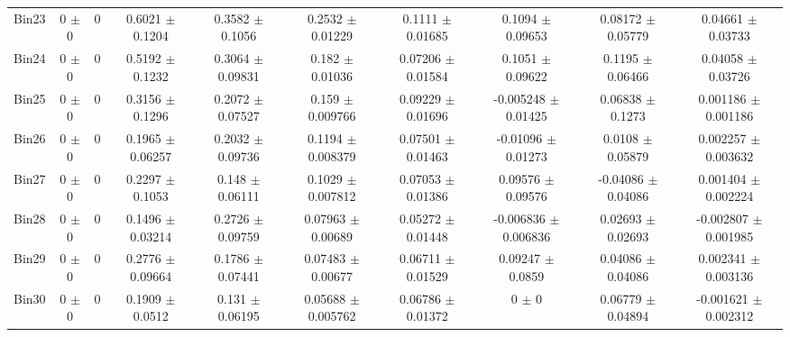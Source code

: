 \begin{tabular}{@{\extracolsep{4pt}}lccccccccc@{}}
     Bin23 & 0 $\pm$ 0 & 0 & 0.6021 $\pm$ 0.1204 & 0.3582 $\pm$ 0.1056 & 0.2532 $\pm$ 0.01229 & 0.1111 $\pm$ 0.01685 & 0.1094 $\pm$ 0.09653 & 0.08172 $\pm$ 0.05779 & 0.04661 $\pm$ 0.03733 \\ 
     Bin24 & 0 $\pm$ 0 & 0 & 0.5192 $\pm$ 0.1232 & 0.3064 $\pm$ 0.09831 & 0.182 $\pm$ 0.01036 & 0.07206 $\pm$ 0.01584 & 0.1051 $\pm$ 0.09622 & 0.1195 $\pm$ 0.06466 & 0.04058 $\pm$ 0.03726 \\ 
     Bin25 & 0 $\pm$ 0 & 0 & 0.3156 $\pm$ 0.1296 & 0.2072 $\pm$ 0.07527 & 0.159 $\pm$ 0.009766 & 0.09229 $\pm$ 0.01696 & -0.005248 $\pm$ 0.01425 & 0.06838 $\pm$ 0.1273 & 0.001186 $\pm$ 0.001186 \\ 
     Bin26 & 0 $\pm$ 0 & 0 & 0.1965 $\pm$ 0.06257 & 0.2032 $\pm$ 0.09736 & 0.1194 $\pm$ 0.008379 & 0.07501 $\pm$ 0.01463 & -0.01096 $\pm$ 0.01273 & 0.0108 $\pm$ 0.05879 & 0.002257 $\pm$ 0.003632 \\ 
     Bin27 & 0 $\pm$ 0 & 0 & 0.2297 $\pm$ 0.1053 & 0.148 $\pm$ 0.06111 & 0.1029 $\pm$ 0.007812 & 0.07053 $\pm$ 0.01386 & 0.09576 $\pm$ 0.09576 & -0.04086 $\pm$ 0.04086 & 0.001404 $\pm$ 0.002224 \\ 
     Bin28 & 0 $\pm$ 0 & 0 & 0.1496 $\pm$ 0.03214 & 0.2726 $\pm$ 0.09759 & 0.07963 $\pm$ 0.00689 & 0.05272 $\pm$ 0.01448 & -0.006836 $\pm$ 0.006836 & 0.02693 $\pm$ 0.02693 & -0.002807 $\pm$ 0.001985 \\ 
     Bin29 & 0 $\pm$ 0 & 0 & 0.2776 $\pm$ 0.09664 & 0.1786 $\pm$ 0.07441 & 0.07483 $\pm$ 0.00677 & 0.06711 $\pm$ 0.01529 & 0.09247 $\pm$ 0.0859 & 0.04086 $\pm$ 0.04086 & 0.002341 $\pm$ 0.003136 \\ 
     Bin30 & 0 $\pm$ 0 & 0 & 0.1909 $\pm$ 0.0512 & 0.131 $\pm$ 0.06195 & 0.05688 $\pm$ 0.005762 & 0.06786 $\pm$ 0.01372 & 0 $\pm$ 0 & 0.06779 $\pm$ 0.04894 & -0.001621 $\pm$ 0.002312 \\ 
\hline\hline
  \end{tabular}
